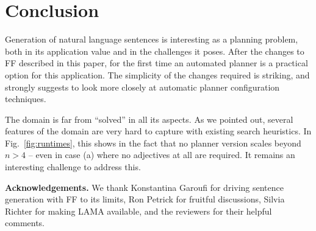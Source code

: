 
\section{Conclusion} \label{sec:conclusion}


Generation of natural language sentences is interesting as a planning
problem, both in its application value and in the challenges it
poses. After the changes to FF described in this paper, for the first
time an automated planner is a practical option for this
application. The simplicity of the changes required is striking, and
strongly suggests to look more closely at automatic planner
configuration techniques.


The domain is far from ``solved'' in all its aspects. As we pointed
out, several features of the domain are very hard to capture with
existing search heuristics. In Fig.~\ref{fig:runtimes}, this shows in
the fact that no planner version scales beyond $n>4$ -- even in case
(a) where no adjectives at all are required. It remains an interesting
challenge to address this.



\smallskip

\noindent
{\bf Acknowledgements.} We thank Konstantina Garoufi for driving
sentence generation with FF to its limits, Ron Petrick for fruitful
discussions, Silvia Richter for making LAMA available, and the
reviewers for their helpful comments.




